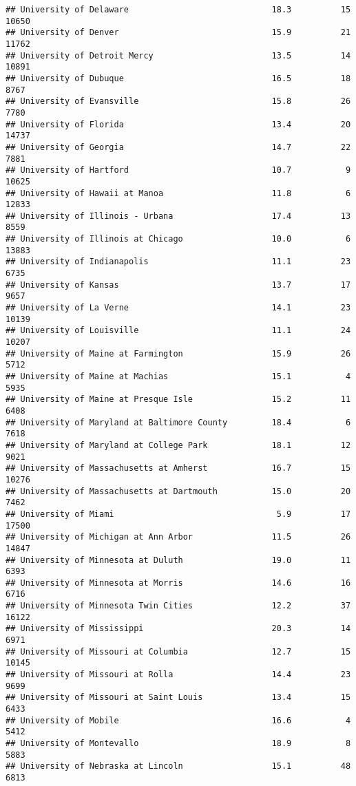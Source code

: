 \documentclass[
]{article}
\begin{document}
\begin{verbatim}
## University of Delaware                             18.3          15  10650
## University of Denver                               15.9          21  11762
## University of Detroit Mercy                        13.5          14  10891
## University of Dubuque                              16.5          18   8767
## University of Evansville                           15.8          26   7780
## University of Florida                              13.4          20  14737
## University of Georgia                              14.7          22   7881
## University of Hartford                             10.7           9  10625
## University of Hawaii at Manoa                      11.8           6  12833
## University of Illinois - Urbana                    17.4          13   8559
## University of Illinois at Chicago                  10.0           6  13883
## University of Indianapolis                         11.1          23   6735
## University of Kansas                               13.7          17   9657
## University of La Verne                             14.1          23  10139
## University of Louisville                           11.1          24  10207
## University of Maine at Farmington                  15.9          26   5712
## University of Maine at Machias                     15.1           4   5935
## University of Maine at Presque Isle                15.2          11   6408
## University of Maryland at Baltimore County         18.4           6   7618
## University of Maryland at College Park             18.1          12   9021
## University of Massachusetts at Amherst             16.7          15  10276
## University of Massachusetts at Dartmouth           15.0          20   7462
## University of Miami                                 5.9          17  17500
## University of Michigan at Ann Arbor                11.5          26  14847
## University of Minnesota at Duluth                  19.0          11   6393
## University of Minnesota at Morris                  14.6          16   6716
## University of Minnesota Twin Cities                12.2          37  16122
## University of Mississippi                          20.3          14   6971
## University of Missouri at Columbia                 12.7          15  10145
## University of Missouri at Rolla                    14.4          23   9699
## University of Missouri at Saint Louis              13.4          15   6433
## University of Mobile                               16.6           4   5412
## University of Montevallo                           18.9           8   5883
## University of Nebraska at Lincoln                  15.1          48   6813

\end{verbatim}
\end{document}
